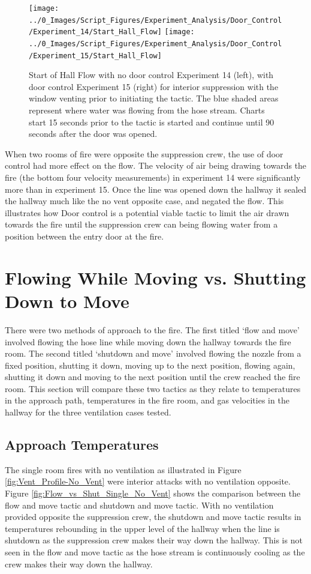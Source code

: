 \documentclass[12pt,oneside]{book}
\begin{document}
\begin{figure}[H]
\centering
\texttt{[image: ../0\_Images/Script\_Figures/Experiment\_Analysis/Door\_Control/Experiment\_14/Start\_Hall\_Flow]}
\texttt{[image: ../0\_Images/Script\_Figures/Experiment\_Analysis/Door\_Control/Experiment\_15/Start\_Hall\_Flow]}
\caption[Door Control Effectiveness - Window Vent]{Start of Hall Flow with no door control Experiment 14 (left), with door control Experiment 15 (right) for interior suppression with the window venting prior to initiating the tactic. The blue shaded areas represent where water was flowing from the hose stream. Charts start 15 seconds prior to the tactic is started and continue until 90 seconds after the door was opened.}
\label{fig:door_control_vent}
\end{figure}

When two rooms of fire were opposite the suppression crew, the use of door control had more effect on the flow. The velocity of air being drawing towards the fire (the bottom four velocity measurements) in experiment 14 were significantly more than in experiment 15. Once the line was opened down the hallway it sealed the hallway much like the no vent opposite case, and negated the flow. This illustrates how Door control is a potential viable tactic to limit the air drawn towards the fire until the suppression crew can being flowing water from a position between the entry door at the fire.   

\section{Flowing While Moving vs. Shutting Down to Move}
There were two methods of approach to the fire. The first titled `flow and move' involved flowing the hose line while moving down the hallway towards the fire room. The second titled `shutdown and move' involved flowing the nozzle from a fixed position, shutting it down, moving up to the next position, flowing again, shutting it down and moving to the next position until the crew reached the fire room. This section will compare these two tactics as they relate to temperatures in the approach path, temperatures in the fire room, and gas velocities in the hallway for the three ventilation cases tested. 

\subsection{Approach Temperatures}

The single room fires with no ventilation as illustrated in Figure \ref{fig:Vent_Profile-No_Vent} were interior attacks with no ventilation opposite. Figure \ref{fig:Flow_vs_Shut_Single_No_Vent} shows the comparison between the flow and move tactic and shutdown and move tactic. With no ventilation provided opposite the suppression crew, the shutdown and move tactic results in temperatures rebounding in the upper level of the hallway when the line is shutdown as the suppression crew makes their way down the hallway. This is not seen in the flow and move tactic as the hose stream is continuously cooling as the crew makes their way down the hallway. 
\end{document}
